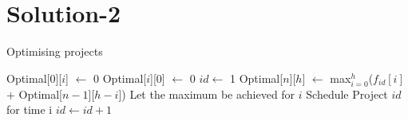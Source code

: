 \documentclass[a4paper,10pt]{article}
\begin{document}
\section{Solution-2}
\begin{algorithm}
 \caption{Optimising projects}
 \begin{algorithmic}
     \State Optimal[$0$][$i$] $\gets$ 0
    \EndFor
     \State Optimal[$i$][$0$] $\gets$ 0
    \EndFor
    \State $id \gets$ 1
      \State Optimal[$n$][$h$] $\gets$ max$_{i=0}^{h}$($f_{id}[i]$ + Optimal[$n-1$][$h-i$])
      \State Let the maximum be achieved for $i$
      \State Schedule Project $id$ for time i
      \State $id \gets id + 1$
     \EndFor
    \EndFor
  \EndFunction
 \end{algorithmic}
\end{algorithm}
\end{document}
